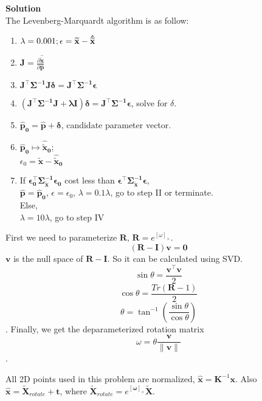 \documentclass{../../assignment}
\begin{document}
\begin{problemlist}
\begin{enumerate}
\textbf{Solution}\\
The Levenberg-Marquardt algorithm is as follow:
\begin{enumerate}[I]
\item $\lambda = 0.001;\\
\epsilon = \mathbf{\widetilde x} - \mathbf{\hat{\widetilde x}}$
\\
\item $\mathbf{J} = \frac{\partial \mathbf{\hat{\widetilde x}}}{\partial \mathbf{\hat{p}}}$
\\
\item $\mathbf{J^{\top} \Sigma^{-1} J \delta = J^{\top} \Sigma^{-1} \epsilon}$
\\
\item $\mathbf{(J^{\top} \Sigma^{-1} J + \lambda I)\delta = J^{\top} \Sigma^{-1} \epsilon}$, solve for $\delta$.
\\
\item $\mathbf{\hat{p}_0 = \hat{p} + \delta}$, candidate parameter vector.
\\
\item $\mathbf{\hat{p}_0 \mapsto \hat{\widetilde x}_0}$;\\
$\epsilon_0 = \mathbf{\widetilde x} - \mathbf{\hat{\widetilde x}_0}$
\\
\item 
If $\mathbf{\epsilon_0^{\top} \Sigma_{\widetilde x}^{-1} \epsilon_0}$ cost less than $\mathbf{\epsilon^{\top} \Sigma_{\widetilde x}^{-1} \epsilon}$,\\
$\mathbf{\hat{p} = \hat{p}_0}$, $\epsilon = \epsilon_0$, $\lambda = 0.1\lambda$, go to step II or terminate.
\\
Else,\\
$\lambda = 10\lambda$, go to step IV\\
\end{enumerate}
First we need to parameterize $\mathbf{R}$, $\mathbf{R} = e^{[\omega]_{\times}}$. 
$$\mathbf{(R-I)v =0}$$
$\mathbf{v}$ is the null space of $\mathbf{R-I}$. So it can be calculated using SVD.
$$\sin\theta = \frac{\mathbf{v^{\top}v}}{2}$$
$$\cos\theta = \frac{Tr(\mathbf{R} - 1)}{2}$$
$$\theta= \tan^{-1}(\frac{\sin\theta}{\cos\theta})$$.
Finally, we get the deparameterized rotation matrix
$$\omega = \theta\frac{\mathbf{v}}{\mathbf{\|v\|}}$$.


All 2D points used in this problem are normalized, $\mathbf{\hat{x}} = \mathbf{K}^{-1}\mathbf{x}$. Also $\mathbf{\hat{x}} = \mathbf{\widetilde{X}}_{rotate} + \mathbf{t}$, where $\mathbf{\widetilde{X}}_{rotate} = e^{[\mathbf{\omega}]_{\times}}\mathbf{\widetilde{X}}$.


\end{enumerate}
\end{problemlist}
\end{document}
